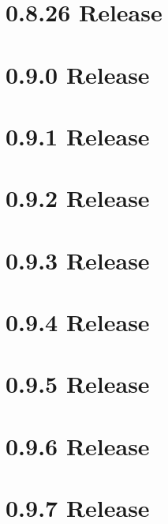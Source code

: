 \let\mypdfximage\pdfximage\def\pdfximage{\immediate\mypdfximage}\documentclass[twoside]{book}
\newcommand{\+}{\discretionary{\mbox{\scriptsize$\hookleftarrow$}}{}{}}
\begin{document}
\chapter{0.8.26 Release}
\label{doc_news_2019-02-26_0_8_26_md}

\chapter{0.9.0 Release}
\label{doc_news_2019-08-06_0_9_0_md}

\chapter{0.9.1 Release}
\label{doc_news_2019-11-26_0_9_1_md}

\chapter{0.9.2 Release}
\label{doc_news_2020-05-26_0_9_2_md}

\chapter{0.9.3 Release}
\label{doc_news_2020-10-30_0_9_3_md}

\chapter{0.9.4 Release}
\label{doc_news_2021-02-01_0_9_4_md}

\chapter{0.9.5 Release}
\label{doc_news_2021-04-12_0_9_5_md}

\chapter{0.9.6 Release}
\label{doc_news_2021-06-07_0_9_6_md}

\chapter{0.9.7 Release}
\label{doc_news_2021-07-09_0_9_7_md}

\end{document}
